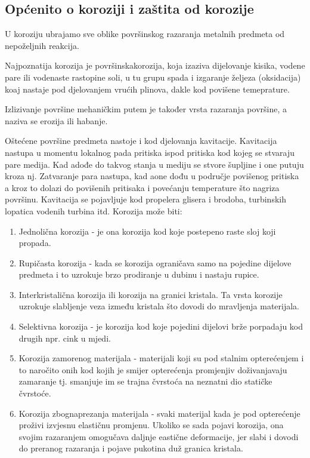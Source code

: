 \documentclass[a4paper,12pt]{article}
\numberwithin{figure}{section}
\begin{document}
\subsection{Općenito o koroziji i zaštita od korozije}
U koroziju ubrajamo sve oblike površinskog razaranja metalnih predmeta od nepoželjnih reakcija.\par
Najpoznatija korozija je površinskakorozija, koja izaziva dijelovanje kisika, vodene pare ili vodenaste rastopine soli, u tu grupu spada i izgaranje željeza (oksidacija) koaj nastaje pod djelovanjem vrućih plinova, dakle kod povišene temeprature.\par
Izlizivanje površine mehaničkim putem je također vrsta razaranja površine, a naziva se erozija ili habanje.\par
Oštećene površine predmeta nastoje i kod djelovanja kavitacije. Kavitacija nastupa u momentu lokalnog pada pritiska ispod pritiska kod kojeg se stvaraju pare medija. Kad adođe do takvog stanja u mediju se stvore šupljine i one putuju kroza nj. Zatvaranje para nastupa, kad aone dođu u područje povišenog pritiska a kroz to dolazi do povišenih pritisaka i povećanju temperature što nagriza površinu. Kavitacija se pojavljuje kod propelera glisera i brodoba, turbinskih lopatica vodenih turbina itd. Korozija može biti:
\begin{enumerate}
\item Jednolična korozija - je ona korozija kod koje postepeno raste sloj koji propada.
\item Rupičasta korozija - kada se korozija ograničava samo na pojedine dijelove predmeta i to uzrokuje brzo prodiranje u dubinu i nastaju rupice.
\item Interkristalična korozija ili korozija na granici kristala. Ta vrsta korozije uzrokuje slabljenje veza između kristala što dovodi do mravljenja materijala.
\item Selektivna korozija - je korozija kod koje pojedini dijelovi brže porpadaju kod drugih npr. cink u mjedi.
\item Korozija zamorenog materijala - materijali koji su pod stalnim opterećenjem i to naročito onih kod kojih je smijer opterećenja promjenjiv doživanjavaju zamaranje tj. smanjuje im se trajna čvrstoća na neznatni dio statičke čvrstoće.
\item Korozija zbognaprezanja materijala - svaki materijal kada je pod opterećenje proživi izvjesnu elastičnu promjenu. Ukoliko se sada pojavi korozija, ona svojim razaranjem omogučava daljnje eastične deformacije, jer slabi i dovodi do preranog razaranja i pojave pukotina duž granica kristala.
\end{enumerate}
\end{document}
